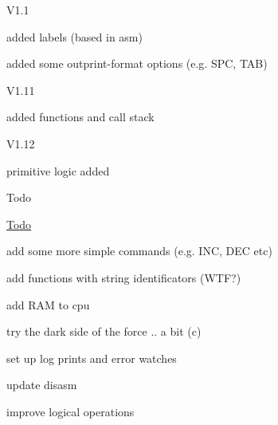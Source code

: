 \begin{DoxyParagraph}{V1.1}

\begin{DoxyItemize}
\item added labels (based in asm)
\item added some outprint-\/format options (e.\-g. S\-P\-C, T\-A\-B)
\end{DoxyItemize}
\end{DoxyParagraph}
\begin{DoxyParagraph}{V1.11}

\begin{DoxyItemize}
\item added functions and call stack
\end{DoxyItemize}
\end{DoxyParagraph}
\begin{DoxyParagraph}{V1.12}

\begin{DoxyItemize}
\item primitive logic added
\end{DoxyItemize}
\end{DoxyParagraph}
\begin{DoxyRefDesc}{Todo}
\item[\hyperlink{todo__todo000001}{Todo}]
\begin{DoxyItemize}
\item add some more simple commands (e.\-g. I\-N\-C, D\-E\-C etc)
\item add functions with string identificators (W\-T\-F?)
\item add R\-A\-M to cpu
\item try the dark side of the force .. a bit (c)
\item set up log prints and error watches
\item update disasm
\item improve logical operations 
\end{DoxyItemize}\end{DoxyRefDesc}

